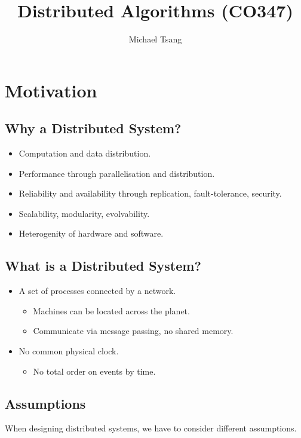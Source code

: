 \documentclass[11pt]{article}
\title{Distributed Algorithms (CO347)}
\author{Michael Tsang}
\begin{document}
\maketitle
\section{Motivation}
\subsection{Why a Distributed System?}
\begin{itemize}
  \item Computation and data distribution.
  \item Performance through parallelisation and distribution.
  \item Reliability and availability through replication, fault-tolerance, security.
  \item Scalability, modularity, evolvability.
  \item Heterogenity of hardware and software.
\end{itemize}

\subsection{What is a Distributed System?}
\begin{itemize}
  \item A set of processes connected by a network.
    \begin{itemize}
      \item Machines can be located across the planet.
      \item Communicate via message passing, no shared memory.
    \end{itemize}
  \item No common physical clock.
    \begin{itemize}
      \item No total order on events by time.
    \end{itemize}
\end{itemize}

\subsection{Assumptions}
When designing distributed systems, we have to consider different assumptions.
\end{document}
